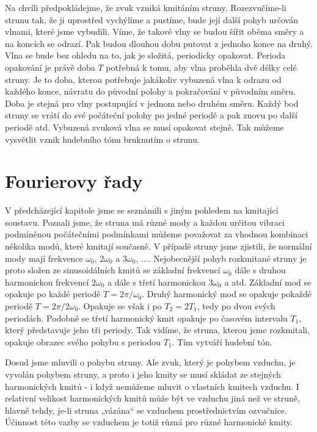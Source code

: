   Na chvíli předpokládejme, že zvuk vzniká kmitáním struny. Rozezvučíme-li strunu tak, že ji 
  uprostřed vychýlíme a pustíme, bude její další pohyb určován vlnami, které jsme vybudili. Víme, 
  že takové vlny se budou šířit oběma směry a na koncích se odrazí. Pak budou dlouhou dobu putovat 
  z jednoho konce na druhý. Vlna se bude bez ohledu na to, jak je složitá, periodicky opakovat. 
  Perioda opakování je právě doba \(T\) potřebná k tomu, aby vlna proběhla dvě délky celé struny. 
  Je to doba, kterou potřebuje jakákoliv vybuzená vlna k odrazu od každého konce, návratu do 
  původní polohy a pokračování v původním směru. Doba je stejná pro vlny postupující v jednom nebo 
  druhém směru. Každý bod struny se vrátí do své počáteční polohy po jedné periodě a pak znovu po 
  další periodě atd. Vybuzená zvuková vlna se musí opakovat stejně. Tak můžeme vysvětlit vznik 
  hudebního tónu brnknutím o strunu.
  
\section{Fourierovy řady}\label{fyz:IchapLsecII}
  V předcházející kapitole jsme se seznámili s jiným pohledem na kmitající soustavu. Poznali jsme, 
  že struna má různé mody a každou určitou vibraci podmíněnou počátečními podmínkami můžeme 
  považovat za vhodnou kombinaci několika modů, které kmitají současně. V případě struny jsme 
  zjistili, že normální mody mají frekvence \(\omega_0\), \(2\omega_0\) a \(3\omega_0\), 
  \(\ldots\). Nejobecnější pohyb rozkmitané struny je proto složen ze sinusoidálních kmitů se 
  základní frekvencí \(\omega_0\) dále s druhou harmonickou frekvencí \(2\omega_0\) a dále s třetí 
  harmonickou \(3\omega_0\) a atd. Základní mod se opakuje po každé periodě \(T=2\pi/\omega_0\). 
  Druhý harmonický mod se opakuje pokaždé periodě \(T=2\pi/2\omega_0\). Opakuje se však i po 
  \(T_2=2T_1\), tedy po dvou svých periodách. Podobně se třetí harmonický kmit opakuje po časovém 
  intervalu \(T_1\), který představuje jeho tři periody. Tak vidíme, že struna, kterou jsme 
  rozkmitali, opakuje obrazec svého pohybu s periodou \(T_1\). Tím vytváří hudební tón. 
  
  Dosud jsme mluvili o pohybu struny. Ale zvuk, který je pohybem vzduchu, je vyvolán pohybem 
  struny, a proto i jeho kmity se musí skládat ze stejných harmonických kmitů - i když nemůžeme 
  mluvit o vlastních kmitech vzduchu. I relativní velikost harmonických kmitů může být ve vzduchu 
  jiná než ve struně, hlavně tehdy, je-li struna „vázána“ se vzduchem prostřednictvím ozvučnice. 
  Účinnost této vazby se vzduchem je totiž různá pro různé harmonické kmity. 
  
